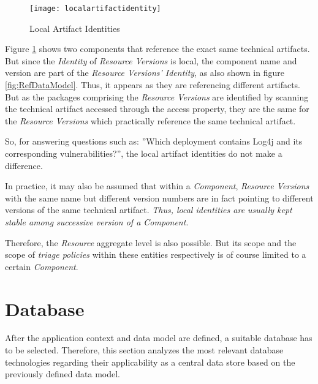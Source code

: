 \begin{figure}[H]
	\centering
	\texttt{[image: localartifactidentity]}
	\caption[Local Artifact Identities]{Local Artifact Identities }
	\label{fig:LocalArtifactIdentity}
\end{figure}

Figure \ref{fig:LocalArtifactIdentity} shows two components that reference the exact same technical artifacts. But since the \emph{Identity} of \emph{Resource Versions} is local, the component name and version are part of the \emph{Resource Versions' Identity}, as also shown in figure \ref{fig:RefDataModel}. Thus, it appears as they are referencing different artifacts. But as the packages comprising the \emph{Resource Versions} are identified by scanning the technical artifact accessed through the access property, they are the same for the \emph{Resource Versions} which practically reference the same technical artifact.\par 
So, for answering questions such as: ''Which deployment contains Log4j and its corresponding vulnerabilities?'', the local artifact identities do not make a difference.\par 
In practice, it may also be assumed that within a \emph{Component}, \emph{Resource Versions} with the same name but different version numbers are in fact pointing to different versions of the same technical artifact. \emph{Thus, local identities are usually kept stable among successive version of a Component}.\par 
Therefore, the \emph{Resource} aggregate level is also possible. But its scope and the scope of \emph{triage policies} within these entities respectively is of course limited to a certain \emph{Component}.

\section{Database}
After the application context and data model are defined, a suitable database has to be selected. Therefore, this section analyzes the most relevant database technologies regarding their applicability as a central data store based on the previously defined data model.

